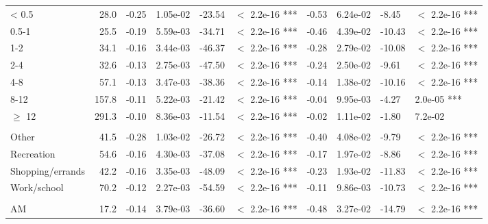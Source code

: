 \documentclass[numbered]{trbunofficial}\usepackage[]{graphicx}\usepackage[]{color}
\begin{document}
\begin{table}[H]
\begin{tabular}{lrllllllll}
\hline
\hspace{1em}< 0.5 & 28.0 & -0.25 & 1.05e-02 & -23.54 & $<$ 2.2e-16 *** & -0.53 & 6.24e-02 & -8.45 & $<$ 2.2e-16 ***\\
\hspace{1em}0.5-1 & 25.5 & -0.19 & 5.59e-03 & -34.71 & $<$ 2.2e-16 *** & -0.46 & 4.39e-02 & -10.43 & $<$ 2.2e-16 ***\\
\hspace{1em}1-2 & 34.1 & -0.16 & 3.44e-03 & -46.37 & $<$ 2.2e-16 *** & -0.28 & 2.79e-02 & -10.08 & $<$ 2.2e-16 ***\\
\hspace{1em}2-4 & 32.6 & -0.13 & 2.75e-03 & -47.50 & $<$ 2.2e-16 *** & -0.24 & 2.50e-02 & -9.61 & $<$ 2.2e-16 ***\\
\hspace{1em}4-8 & 57.1 & -0.13 & 3.47e-03 & -38.36 & $<$ 2.2e-16 *** & -0.14 & 1.38e-02 & -10.16 & $<$ 2.2e-16 ***\\
\hspace{1em}8-12 & 157.8 & -0.11 & 5.22e-03 & -21.42 & $<$ 2.2e-16 *** & -0.04 & 9.95e-03 & -4.27 & 2.0e-05 ***\\
\hspace{1em}$\geq$ 12 & 291.3 & -0.10 & 8.36e-03 & -11.54 & $<$ 2.2e-16 *** & -0.02 & 1.11e-02 & -1.80 & 7.2e-02\\
\addlinespace[0.3em]
\multicolumn{10}{l}{\textbf{Trip purpose model, $McFadden~R^2 = 0.55$}}\\
\hline
\hspace{1em}Other & 41.5 & -0.28 & 1.03e-02 & -26.72 & $<$ 2.2e-16 *** & -0.40 & 4.08e-02 & -9.79 & $<$ 2.2e-16 ***\\
\hspace{1em}Recreation & 54.6 & -0.16 & 4.30e-03 & -37.08 & $<$ 2.2e-16 *** & -0.17 & 1.97e-02 & -8.86 & $<$ 2.2e-16 ***\\
\hspace{1em}Shopping/errands & 42.2 & -0.16 & 3.35e-03 & -48.09 & $<$ 2.2e-16 *** & -0.23 & 1.93e-02 & -11.83 & $<$ 2.2e-16 ***\\
\hspace{1em}Work/school & 70.2 & -0.12 & 2.27e-03 & -54.59 & $<$ 2.2e-16 *** & -0.11 & 9.86e-03 & -10.73 & $<$ 2.2e-16 ***\\
\addlinespace[0.3em]
\multicolumn{10}{l}{\textbf{Time-of-day model, $McFadden~R^2 = 0.53$}}\\
\hline
\hspace{1em}AM & 17.2 & -0.14 & 3.79e-03 & -36.60 & $<$ 2.2e-16 *** & -0.48 & 3.27e-02 & -14.79 & $<$ 2.2e-16 ***\\

\end{tabular}
\end{table}
\end{document}
